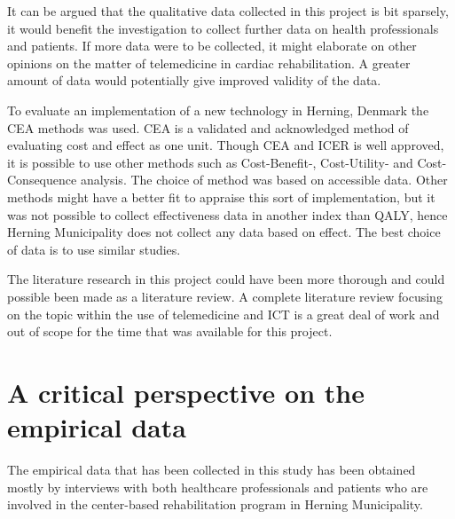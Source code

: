 It can be argued that the qualitative data collected in this project is bit sparsely, it would benefit the investigation to collect further data on health professionals and patients. If more data were to be collected, it might elaborate on other opinions on the matter of telemedicine in cardiac rehabilitation. A greater amount of data would potentially give improved validity of the data. 

To evaluate an implementation of a new technology in Herning, Denmark the CEA methods was used. CEA is a validated and acknowledged method of evaluating cost and effect as one unit. Though CEA and ICER is well approved, it is possible to use other methods such as Cost-Benefit-, Cost-Utility- and Cost-Consequence analysis. The choice of method was based on accessible data. Other methods might have a better fit to appraise this sort of implementation, but it was not possible to collect effectiveness data in another index than QALY, hence Herning Municipality does not collect any data based on effect. The best choice of data is to use similar studies. 

The literature research in this project could have been more thorough and could possible been made as a literature review. A complete literature review focusing on the topic within the use of telemedicine and ICT is a great deal of work and out of scope for the time that was available for this project. 


\section{A critical perspective on the empirical data}
 
 The empirical data that has been collected in this study has been obtained mostly by interviews with both healthcare professionals and patients who are involved in the center-based rehabilitation program in Herning Municipality. 

